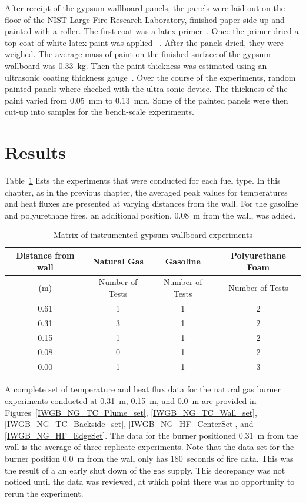 \documentclass[twoside]{uocthesis}
\begin{document}
{After receipt of the gypsum wallboard panels, the panels were laid out on the floor of the NIST Large Fire Research Laboratory, finished paper side up and painted with a roller.  The first coat was a latex primer~\cite{Latex_Primer}.  Once the primer dried a top coat of white latex paint was applied ~\cite{Latex_Paint}.  After the panels dried, they were weighed. The average mass of paint on the finished surface of the gypsum wallboard was 0.33~kg. Then the paint thickness was estimated using an ultrasonic coating thickness gauge~\cite{defelsko}.  Over the course of the experiments, random painted panels where checked with the ultra sonic device. The thickness of the paint varied from 0.05~mm to 0.13~mm.  Some of the painted panels were then cut-up into samples for the bench-scale experiments.


\section{Results}

Table~\ref{tab:IWGB_experiments} lists the experiments that were conducted for each fuel type.  In this chapter, as in the previous chapter, the averaged peak values for temperatures and heat fluxes are presented at varying distances from the wall.  For the gasoline and polyurethane fires, an additional position, 0.08~m from the wall, was added.

\begin{table}[ht!]
	\centering
	\begin{tabular}{|c|c|c|c|}
		\hline Distance from wall  	& Natural Gas 		& Gasoline			& Polyurethane Foam \\
		\hline (m) 					& Number of Tests 	& Number of Tests  	& Number of Tests 	\\ \hline
		\hline 0.61 				& 1 				& 1 				& 2 			 	\\
		\hline 0.31					& 3	 				& 1					& 2 			 	\\
		\hline 0.15					& 1				 	& 1					& 2 			 	\\
		\hline 0.08					& 0 				& 1 				& 2 	 			\\
		\hline 0.00					& 1 				& 1 				& 3 	 			\\
		\hline
	\end{tabular}
	\caption[Matrix of instrumented gypsum wallboard experiments]{Matrix of instrumented gypsum wallboard experiments}
	\label{tab:IWGB_experiments}
\end{table}

A complete set of temperature and heat flux data for the natural gas burner experiments conducted at 0.31~m, 0.15~m, and 0.0~m are provided in Figures~\ref{IWGB_NG_TC_Plume_set}, \ref{IWGB_NG_TC_Wall_set}, \ref{IWGB_NG_TC_Backside_set}, \ref{IWGB_NG_HF_CenterSet}, and \ref{IWGB_NG_HF_EdgeSet}.  The data for the burner positioned 0.31~m from the wall is the average of three replicate experiments.  Note that the data set for the burner position 0.0~m from the wall only has 180~seconds of fire data.  This was the result of a an early shut down of the gas supply.  This decrepancy was not noticed until the data was reviewed, at which point there was no opportunity to rerun the experiment.    

}
\end{document}
